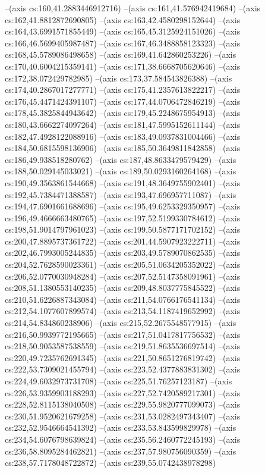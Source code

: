 --(axis cs:160,41.2883446912716)
--(axis cs:161,41.576942419684)
--(axis cs:162,41.8812872690805)
--(axis cs:163,42.4580298152644)
--(axis cs:164,43.6991571855449)
--(axis cs:165,45.3125924151026)
--(axis cs:166,46.5699405987487)
--(axis cs:167,46.3488858123323)
--(axis cs:168,45.5789086498658)
--(axis cs:169,41.642860253226)
--(axis cs:170,40.6004215359141)
--(axis cs:171,38.6668705620646)
--(axis cs:172,38.072429782985)
--(axis cs:173,37.584543826388)
--(axis cs:174,40.2867017277771)
--(axis cs:175,41.2357613822217)
--(axis cs:176,45.4471424391107)
--(axis cs:177,44.0706472846219)
--(axis cs:178,45.3825844943642)
--(axis cs:179,45.2248675954913)
--(axis cs:180,43.6662274097264)
--(axis cs:181,47.5995152611144)
--(axis cs:182,47.4928122088916)
--(axis cs:183,49.0937831004466)
--(axis cs:184,50.6815598136906)
--(axis cs:185,50.3649811842858)
--(axis cs:186,49.938518280762)
--(axis cs:187,48.8633479579429)
--(axis cs:188,50.029145033021)
--(axis cs:189,50.0293160264168)
--(axis cs:190,49.3563861544668)
--(axis cs:191,48.3649755902401)
--(axis cs:192,45.7384471388587)
--(axis cs:193,47.696957711087)
--(axis cs:194,47.6901661688696)
--(axis cs:195,49.6253329350957)
--(axis cs:196,49.4666663480765)
--(axis cs:197,52.5199330784612)
--(axis cs:198,51.9014797961023)
--(axis cs:199,50.5877171702152)
--(axis cs:200,47.8895737361722)
--(axis cs:201,44.5907923222711)
--(axis cs:202,46.7993005244835)
--(axis cs:203,49.5789070862535)
--(axis cs:204,52.7628590023361)
--(axis cs:205,51.0634205352022)
--(axis cs:206,52.0770030948284)
--(axis cs:207,52.5147358091961)
--(axis cs:208,51.1380553140235)
--(axis cs:209,48.8037775845522)
--(axis cs:210,51.6226887343084)
--(axis cs:211,54.0766176541134)
--(axis cs:212,54.1077607899574)
--(axis cs:213,54.1187419652992)
--(axis cs:214,54.834860238906)
--(axis cs:215,52.2675548577915)
--(axis cs:216,50.9939772195665)
--(axis cs:217,51.0417817756532)
--(axis cs:218,50.9053587538559)
--(axis cs:219,51.8635536697514)
--(axis cs:220,49.7235762691345)
--(axis cs:221,50.8651276819742)
--(axis cs:222,53.7309021455794)
--(axis cs:223,52.4377883831302)
--(axis cs:224,49.6032973731708)
--(axis cs:225,51.76257123187)
--(axis cs:226,53.9359903188293)
--(axis cs:227,52.7420589217301)
--(axis cs:228,52.8115138040508)
--(axis cs:229,55.9820777099073)
--(axis cs:230,51.9520621679258)
--(axis cs:231,53.0282497343407)
--(axis cs:232,52.9546664541392)
--(axis cs:233,53.843599829978)
--(axis cs:234,54.6076798639824)
--(axis cs:235,56.2460772245193)
--(axis cs:236,58.8095284462821)
--(axis cs:237,57.980756090359)
--(axis cs:238,57.7178048722872)
--(axis cs:239,55.0742438978298)

